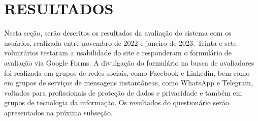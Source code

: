 \documentclass[
	12pt,				%
	openright,			%
	oneside,			%
	a4paper,			%
	english,			%
	french,				%
	spanish,			%
	brazil,				%
	]{abntex2}
\begin{document}
\pagebreak


\chapter{RESULTADOS}
\label{ch: resultados} 

Nesta seção, serão descritos os resultados da avaliação do sistema com os usuários, realizada entre novembro de 2022 e janeiro de 2023. Trinta e sete voluntários testaram a usabilidade do site e responderam o formulário de avaliação via Google Forms. A divulgação do formulário na busca de avaliadores foi realizada em grupos de redes sociais, como Facebook e Linkedin, bem como em grupos de serviços de mensagens instantâneas, como WhatsApp e Telegram, voltados para profissionais de proteção de dados e privacidade e também em grupos de tecnologia da informação. Os resultados do questionário serão apresentados na próxima subseção.
\end{document}
